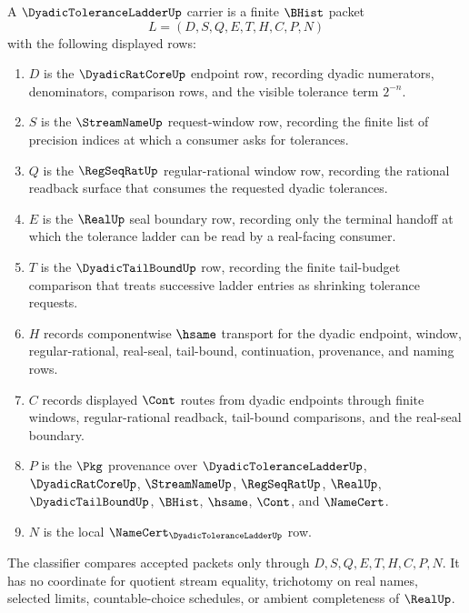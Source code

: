 \begin{definition}
\label{def:dyadic-tolerance-ladder-carrier}
A $\DyadicToleranceLadderUp$ carrier is a finite $\BHist$ packet
$$
L=(D,S,Q,E,T,H,C,P,N)
$$
with the following displayed rows:
\begin{enumerate}
\item $D$ is the $\DyadicRatCoreUp$ endpoint row, recording dyadic numerators, denominators, comparison rows, and the visible tolerance term $2^{-n}$.
\item $S$ is the $\StreamNameUp$ request-window row, recording the finite list of precision indices at which a consumer asks for tolerances.
\item $Q$ is the $\RegSeqRatUp$ regular-rational window row, recording the rational readback surface that consumes the requested dyadic tolerances.
\item $E$ is the $\RealUp$ seal boundary row, recording only the terminal handoff at which the tolerance ladder can be read by a real-facing consumer.
\item $T$ is the $\DyadicTailBoundUp$ row, recording the finite tail-budget comparison that treats successive ladder entries as shrinking tolerance requests.
\item $H$ records componentwise $\hsame$ transport for the dyadic endpoint, window, regular-rational, real-seal, tail-bound, continuation, provenance, and naming rows.
\item $C$ records displayed $\Cont$ routes from dyadic endpoints through finite windows, regular-rational readback, tail-bound comparisons, and the real-seal boundary.
\item $P$ is the $\Pkg$ provenance over $\DyadicToleranceLadderUp$, $\DyadicRatCoreUp$, $\StreamNameUp$, $\RegSeqRatUp$, $\RealUp$, $\DyadicTailBoundUp$, $\BHist$, $\hsame$, $\Cont$, and $\NameCert$.
\item $N$ is the local $\NameCert_{\DyadicToleranceLadderUp}$ row.
\end{enumerate}
The classifier compares accepted packets only through $D,S,Q,E,T,H,C,P,N$. It has no coordinate for quotient stream equality, trichotomy on real names, selected limits, countable-choice schedules, or ambient completeness of $\RealUp$.
\end{definition}

